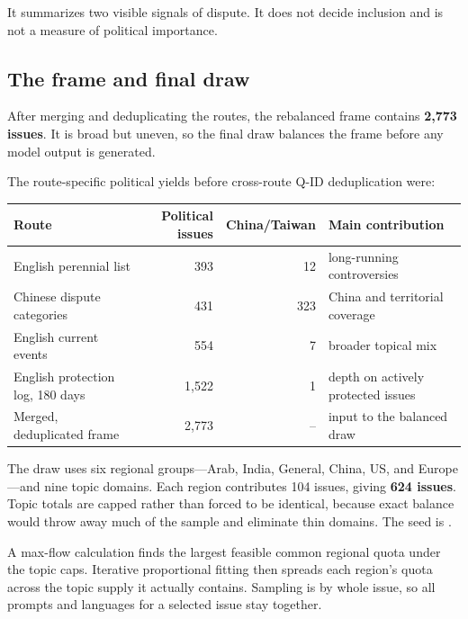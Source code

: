 \documentclass[11pt]{article}
\DeclareRobustCommand{\code}[1]{\texttt{\seqsplit{#1}}}
\begin{document}
It summarizes two visible signals of dispute. It does not decide inclusion and
is not a measure of political importance.

\subsection{The frame and final draw}

After merging and deduplicating the routes, the rebalanced frame contains
\textbf{2,773 issues}. It is broad but uneven, so the final draw balances the
frame before any model output is generated.

The route-specific political yields before cross-route Q-ID deduplication were:

\begin{center}
\small
\begin{tabular}{@{}lrrl@{}}
\toprule Route & Political issues & China/Taiwan & Main contribution \\
\midrule
English perennial list & 393 & 12 & long-running controversies \\
Chinese dispute categories & 431 & 323 & China and territorial coverage \\
English current events & 554 & 7 & broader topical mix \\
English protection log, 180 days & 1,522 & 1 & depth on actively protected issues \\
\midrule
Merged, deduplicated frame & 2,773 & -- & input to the balanced draw \\
\bottomrule
\end{tabular}
\end{center}

The draw uses six regional groups---Arab, India, General, China, US, and
Europe---and nine topic domains. Each region contributes 104 issues, giving
\textbf{624 issues}. Topic totals are capped rather than forced to be identical,
because exact balance would throw away much of the sample and eliminate thin
domains. The seed is \code{20260728}.

A max-flow calculation finds the largest feasible common regional quota under
the topic caps. Iterative proportional fitting then spreads each region's quota
across the topic supply it actually contains. Sampling is by whole issue, so all
prompts and languages for a selected issue stay together.
\end{document}
